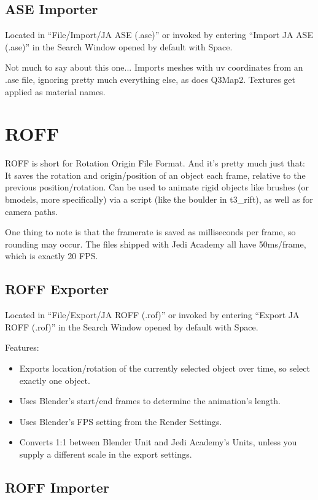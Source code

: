 \documentclass[a4paper,10pt]{article}
\begin{document}
 \subsection{ASE Importer}
 
 Located in ``File/Import/JA ASE (.ase)'' or invoked by entering ``Import JA ASE (.ase)'' in the Search Window
 opened by default with Space.
 
 Not much to say about this one... Imports meshes with uv coordinates from an .ase file, ignoring pretty much
 everything else, as does Q3Map2. Textures get applied as material names.
 
 \section{ROFF}
 
 ROFF is short for Rotation Origin File Format. And it's pretty much just that: It saves the rotation and
 origin/position of an object each frame, relative to the previous position/rotation. Can be used to animate
 rigid objects like brushes (or bmodels, more specifically) via a script (like the boulder in t3\_rift), as
 well as for camera paths.
 
 One thing to note is that the framerate is saved as milliseconds per frame, so rounding may occur. The
 files shipped with Jedi Academy all have 50ms/frame, which is exactly 20 FPS.
 
 \subsection{ROFF Exporter}
 
 Located in ``File/Export/JA ROFF (.rof)'' or invoked by entering ``Export JA ROFF (.rof)'' in the Search Window
 opened by default with Space.
 
 Features:
 \begin{itemize}
  \item Exports location/rotation of the currently selected object over time, so select exactly one object.
  \item Uses Blender's start/end frames to determine the animation's length.
  \item Uses Blender's FPS setting from the Render Settings.
  \item Converts 1:1 between Blender Unit and Jedi Academy's Units, unless you supply a different scale in
  the export settings.
 \end{itemize}

 \subsection{ROFF Importer}
 
\end{document}
